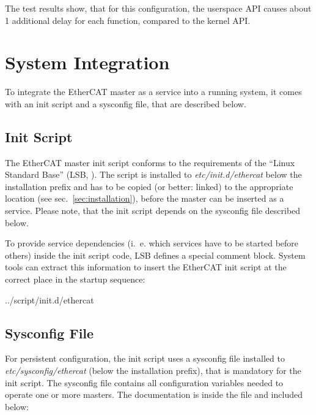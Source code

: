 \documentclass[a4paper,12pt,BCOR6mm,bibtotoc,idxtotoc]{scrbook}
\begin{document}
The test results show, that for this configuration, the userspace API causes
about \unit{1}{\micro\second} additional delay for each function, compared to
the kernel API.


\section{System Integration}
\label{sec:system}

To integrate the EtherCAT master as a service into a running system, it comes
with an init script and a sysconfig file, that are described below.

\subsection{Init Script}
\label{sec:init}

The EtherCAT master init script conforms to the requirements of the ``Linux
Standard Base'' (LSB, \cite{lsb}). The script is installed to
\textit{etc/init.d/ethercat} below the installation prefix and has to be
copied (or better: linked) to the appropriate location (see
sec.~\ref{sec:installation}), before the master can be inserted as a service.
Please note, that the init script depends on the sysconfig file described
below.

To provide service dependencies (i.~e. which services have to be started before
others) inside the init script code, LSB defines a special comment block.
System tools can extract this information to insert the EtherCAT init script at
the correct place in the startup sequence:


    {../script/init.d/ethercat}

\subsection{Sysconfig File}
\label{sec:sysconfig}

For persistent configuration, the init script uses a sysconfig file installed
to \textit{etc/sysconfig/ethercat} (below the installation prefix), that is
mandatory for the init script. The sysconfig file contains all configuration
variables needed to operate one or more masters. The documentation is inside
the file and included below:
\end{document}
